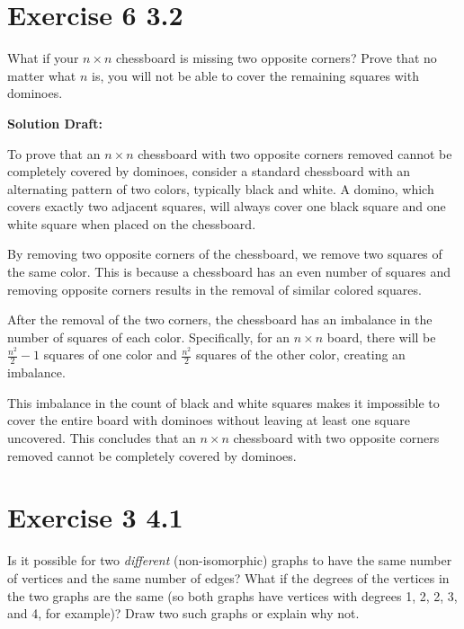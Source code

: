 \documentclass{article}
\begin{document}
\section*{Exercise 6 3.2}  

What if your \(n\times n\) chessboard is missing two opposite corners? Prove that no matter what \(n\) is, you will not be able to cover the remaining squares with dominoes.

\vspace{0.5cm}
\noindent\textbf{Solution Draft:} 
\vspace{0.2cm}

To prove that an $n \times n$ chessboard with two opposite corners removed cannot be completely covered by dominoes, consider a standard chessboard with an alternating pattern of two colors, typically black and white. A domino, which covers exactly two adjacent squares, will always cover one black square and one white square when placed on the chessboard.

By removing two opposite corners of the chessboard, we remove two squares of the same color. This is because a chessboard has an even number of squares and removing opposite corners results in the removal of similar colored squares.

After the removal of the two corners, the chessboard has an imbalance in the number of squares of each color. Specifically, for an $n \times n$ board, there will be $\frac{n^2}{2} - 1$ squares of one color and $\frac{n^2}{2}$ squares of the other color, creating an imbalance.

This imbalance in the count of black and white squares makes it impossible to cover the entire board with dominoes without leaving at least one square uncovered. This concludes that an $n \times n$ chessboard with two opposite corners removed cannot be completely covered by dominoes.




\section*{Exercise 3 4.1}  

Is it possible for two \emph{different} (non-isomorphic) graphs to have the same number of vertices and the same number of edges? What if the degrees of the vertices in the two graphs are the same (so both graphs have vertices with degrees 1, 2, 2, 3, and 4, for example)? Draw two such graphs or explain why not.
\end{document}
